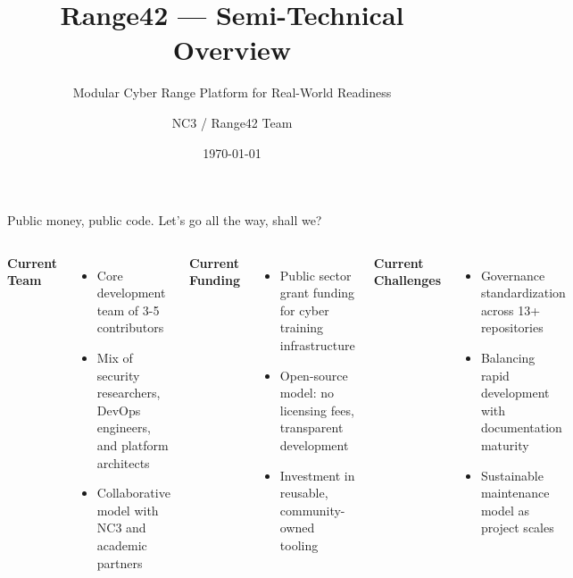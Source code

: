 \documentclass[aspectratio=169]{beamer}
\title{\faIcon{shield-alt}\; Range42 — Semi-Technical Overview}
\subtitle{Modular Cyber Range Platform for Real-World Readiness}
\author{NC3 / Range42 Team}
\date{\today}
\institute{\faServer\; Proxmox \quad \faCogs\; Ansible \quad \faProjectDiagram\; Orchestration \quad \faBinoculars\; Telemetry}
\begin{document}
\begin{frame}
  \titlepage
\end{frame}

\begin{frame}{Public money, public code. Let's go all the way, shall we?}
  \begin{columns}[T]
    \textbf{Current Team}
    \begin{itemize}
      \item Core development team of 3-5 contributors
      \item Mix of security researchers, DevOps engineers, and platform architects
      \item Collaborative model with NC3 and academic partners
    \end{itemize}
    
    \textbf{Current Funding}
    \begin{itemize}
      \item Public sector grant funding for cyber training infrastructure
      \item Open-source model: no licensing fees, transparent development
      \item Investment in reusable, community-owned tooling
    \end{itemize}
    
    \textbf{Current Challenges}
    \begin{itemize}
      \item Governance standardization across 13+ repositories
      \item Balancing rapid development with documentation maturity
      \item Sustainable maintenance model as project scales
    \end{itemize}
    

\end{columns}
\end{frame}
\end{document}

